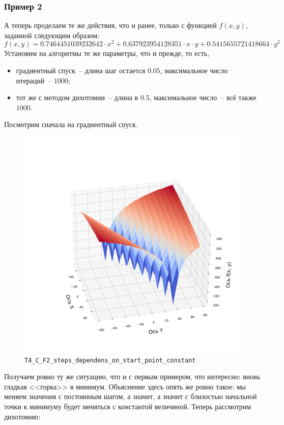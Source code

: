 \documentclass[12pt, a4paper, oneside, final]{article}
\begin{document}
	\subsubsection*{Пример 2}
	А теперь проделаем те же действия, что и ранее, только с функцией $f(x, y)$, заданной следующим образом:
	\[
		f(x, y) = 0.7464451039232642 \cdot x^{2} + 0.637923954128351 \cdot x \cdot y + 0.5415655721418664 \cdot y^{2}
	\]
	Установим на алгоритмы те же параметры, что и прежде, то есть,
	\begin{itemize}
		\item градиентный спуск~-- длина шаг остается $0.05$, максимальное число итераций~-- $1000$;
		\item тот же с методом дихотомии~-- длина в $0.5$, максимальное число~-- всё также $1000$.
	\end{itemize}
	Посмотрим сначала на градиентный спуск.
	\begin{figure}[H]
		\centering
		\includegraphics[scale=0.68]{Image/T4_C_F2_steps_dependens_on_start_point_constant.png}
		\caption*{\texttt{T4\_C\_F2\_steps\_dependens\_on\_start\_point\_constant}}
	\end{figure}
	Получаем ровно ту же ситуацию, что и с первым примером, что интересно: вновь гладкая <<горка>> в минимум. Объяснение здесь опять же ровно такое: мы меняем значения с постоянным шагом, а значит, а значит с близостью начальной точки к минимуму будет меняться с константой величиной. Теперь рассмотрим дихотомию:
\end{document}
